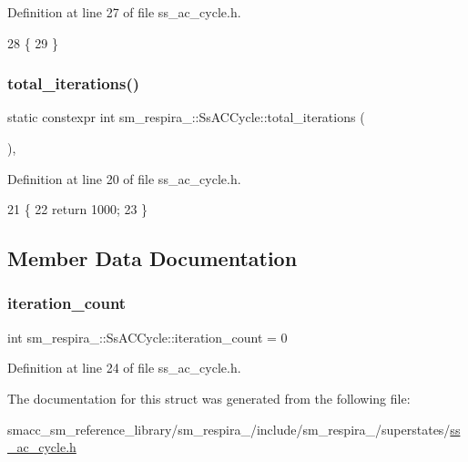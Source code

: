 Definition at line 27 of file ss\+\_\+ac\+\_\+cycle.\+h.


\begin{DoxyCode}
28   \{
29   \}
\end{DoxyCode}
\mbox{\label{structsm__respira__1_1_1SsACCycle_ada67628c77066b0c433f8e3562103efa}} 
\subsubsection{\texorpdfstring{total\+\_\+iterations()}{total\_iterations()}}
{\footnotesize\ttfamily static constexpr int sm\+\_\+respira\+\_\+::\+Ss\+A\+C\+Cycle\+::total\+\_\+iterations (\begin{DoxyParamCaption}{ }\end{DoxyParamCaption})\hspace{0.3cm}{\ttfamily [inline]}, {\ttfamily [static]}}



Definition at line 20 of file ss\+\_\+ac\+\_\+cycle.\+h.


\begin{DoxyCode}
21   \{
22     \textcolor{keywordflow}{return} 1000;
23   \}
\end{DoxyCode}


\subsection{Member Data Documentation}
\mbox{\label{structsm__respira__1_1_1SsACCycle_a4ef244bca6bba33cb2ad030666c4b47f}} 
\subsubsection{\texorpdfstring{iteration\+\_\+count}{iteration\_count}}
{\footnotesize\ttfamily int sm\+\_\+respira\+\_\+::\+Ss\+A\+C\+Cycle\+::iteration\+\_\+count = 0}



Definition at line 24 of file ss\+\_\+ac\+\_\+cycle.\+h.



The documentation for this struct was generated from the following file\+:\begin{DoxyCompactItemize}
\item 
smacc\+\_\+sm\+\_\+reference\+\_\+library/sm\+\_\+respira\+\_/include/sm\+\_\+respira\+\_/superstates/\hyperlink{ss__ac__cycle_8h}{ss\+\_\+ac\+\_\+cycle.\+h}\end{DoxyCompactItemize}
